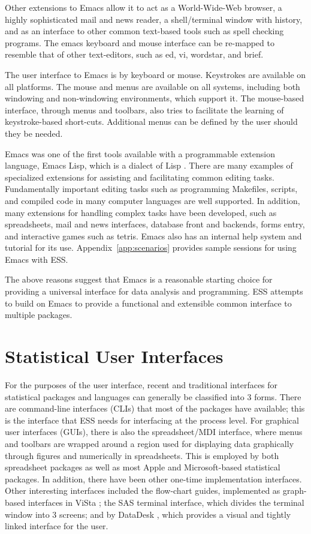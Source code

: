 \documentclass{article}
\begin{document}
Other extensions to Emacs allow it to act as a World-Wide-Web browser,
a highly sophisticated mail and news reader, a shell/terminal window
with history, and as an interface to other common text-based tools
such as spell checking programs.  The emacs keyboard and mouse
interface can be re-mapped to resemble that of other text-editors,
such as ed, vi, wordstar, and brief.

The user interface to Emacs is by keyboard or mouse.  Keystrokes are
available on all platforms.  The mouse and menus are available on all
systems, including both windowing and non-windowing environments,
which support it.  The mouse-based interface, through menus and
toolbars, also tries to facilitate the learning of keystroke-based
short-cuts.  Additional menus can be defined by the user should they
be needed.

Emacs was one of the first tools available with a programmable
extension language, Emacs Lisp, which is a dialect of Lisp
\citep{RChassell1999,PGraham:1996}.  There are many examples of
specialized extensions for assisting and facilitating common editing
tasks.  Fundamentally important editing tasks such as programming
Makefiles, scripts, and compiled code in many computer languages are
well supported.  In addition, many extensions for handling complex
tasks have been developed, such as spreadsheets, mail and news
interfaces, database front and backends, forms entry, and interactive
games such as tetris.  Emacs also has an internal help system and
tutorial for its use.  Appendix~\ref{app:scenarios} provides sample
sessions for using Emacs with ESS.

The above reasons suggest that Emacs is a reasonable starting choice
for providing a universal interface for data analysis and programming.
ESS attempts to build on Emacs to provide a functional and extensible
common interface to multiple packages.

\section{Statistical User Interfaces}
\label{sec:UI}

For the purposes of the user interface, recent and traditional
interfaces for statistical packages and languages can generally be
classified into 3 forms.  There are command-line interfaces (CLIs)
that most of the packages have available; this is the interface that
ESS needs for interfacing at the process level.  For graphical user
interfaces (GUIs), there is also the spreadsheet/MDI interface, where
menus and toolbars are wrapped around a region used for displaying
data graphically through figures and numerically in spreadsheets.
This is employed by both spreadsheet packages as well as most Apple
and Microsoft-based statistical packages.  In addition, there have
been other one-time implementation interfaces.  Other interesting
interfaces included the flow-chart guides, implemented as graph-based
interfaces in ViSta \citep{youn:lubi:1995}; the SAS terminal
interface, which divides the terminal window into 3 screens; and by
DataDesk \citep{vell:prat:1989}, which provides a visual and tightly
linked interface for the user.
\end{document}
